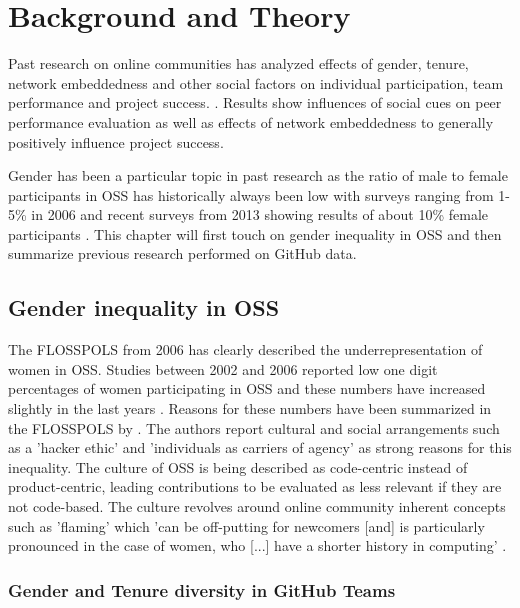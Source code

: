 \section{Background and Theory}

Past research on online communities has analyzed effects of gender, tenure, network embeddedness and other social factors on individual participation, team performance and project success. \cite{Vasilescu:2015:GTD:2702123.2702549,vasilescu:2012:6542459,doi:10.1287/mnsc.1060.0550}. Results show influences of social cues on peer performance evaluation as well as effects of network embeddedness to generally positively influence project success.


Gender has been a particular topic in past research as the ratio of male to female participants in \ac{OSS} has historically always been low with surveys ranging from 1-5\% in 2006 and recent surveys from 2013 showing results of about 10\% female participants \cite{Vasilescu:2015:GTD:2702123.2702549,flosspols-gender:2005}. This chapter will first touch on gender inequality in \ac{OSS} and then summarize previous research performed on GitHub data.


\subsection{Gender inequality in OSS}

The \ac{FLOSSPOLS} from 2006 has clearly described the underrepresentation of women in \ac{OSS}. Studies between 2002 and 2006 reported low one digit percentages of women participating in \ac{OSS} and these numbers have increased slightly in the last years \cite{Vasilescu:2015:GTD:2702123.2702549}. Reasons for these numbers have been summarized in the \ac{FLOSSPOLS} by \citeauthor{flosspols-gender:2005}.
The authors report cultural and social arrangements such as a 'hacker ethic' and 'individuals as carriers of agency' as strong reasons for this inequality. The culture of \ac{OSS} is being described as code-centric instead of product-centric, leading contributions to be evaluated as less relevant if they are not code-based. The culture revolves around online community inherent concepts such as 'flaming' which 'can be off-putting for newcomers [and] is particularly pronounced in the case of women, who [...] have a shorter history in computing' \cite[p.6]{flosspols-gender:2005}.

\subsubsection{Gender and Tenure diversity in GitHub Teams}

